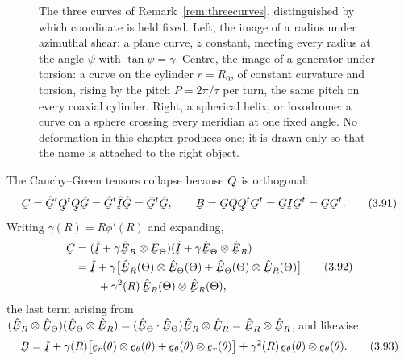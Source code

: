 \begin{figure}[htbp]
\caption{The three curves of Remark~\ref{rem:threecurves}, distinguished
by which coordinate is held fixed. Left, the image of a radius under
azimuthal shear: a plane curve, $z$ constant, meeting every radius at the
angle $\psi$ with $\tan\psi=\gamma$. Centre, the image of a generator
under torsion: a curve on the cylinder $r=R_{0}$, of constant curvature and
torsion, rising by the pitch $P=2\pi/\tau$ per turn, the same pitch on
every coaxial cylinder. Right, a spherical helix, or loxodrome: a curve on
a sphere crossing every meridian at one fixed angle. No deformation in
this chapter produces one; it is drawn only so that the name is attached to
the right object.}
\label{fig:curves}
\end{figure}

The Cauchy--Green tensors collapse because $\bQ$ is orthogonal:
\begin{equation}
   \bC=\hat\bG^{t}\bQ^{t}\bQ\hat\bG=\hat\bG^{t}\hI\hat\bG
      =\hat\bG^{t}\hat\bG,
   \qquad
   \bB=\bG\bQ\bQ^{t}\bG^{t}=\bG\I\bG^{t}=\bG\bG^{t}.
   \tag{3.91}\label{eq:3.91}
\end{equation}
Writing $\gamma(R)=R\phi'(R)$ and expanding,
\begin{equation}
\begin{aligned}
   \bC&=(\hI+\gamma\hER\otimes\hETh)(\hI+\gamma\hETh\otimes\hER)\\
   &=\hI+\gamma\big[\hER(\Theta)\otimes\hETh(\Theta)
      +\hETh(\Theta)\otimes\hER(\Theta)\big]\\
   &\qquad+\gamma^{2}(R)\,\hER(\Theta)\otimes\hER(\Theta),
\end{aligned}
   \tag{3.92}\label{eq:3.92}
\end{equation}
the last term arising from
$(\hER\otimes\hETh)(\hETh\otimes\hER)=(\ip{\hETh}{\hETh})\hER\otimes\hER
=\hER\otimes\hER$, and likewise
\begin{equation}
   \bB=\I+\gamma(R)\big[\ber(\theta)\otimes\bet(\theta)
       +\bet(\theta)\otimes\ber(\theta)\big]
       +\gamma^{2}(R)\,\bet(\theta)\otimes\bet(\theta).
   \tag{3.93}\label{eq:3.93}
\end{equation}

